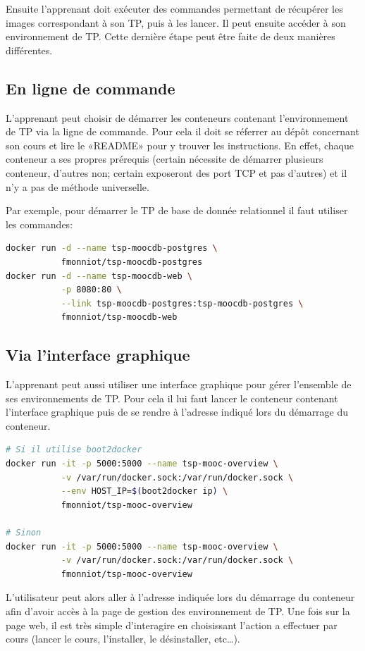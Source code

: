 \documentclass[a4paper,11pt]{report}
\begin{document}
Ensuite l'apprenant doit exécuter des commandes permettant de récupérer les images correspondant à son TP, puis à les lancer. Il peut ensuite accéder à son environnement de TP. Cette dernière étape peut être faite de deux manières différentes.

\subsection{En ligne de commande}

L'apprenant peut choisir de démarrer les conteneurs contenant l'environnement de TP via la ligne de commande. Pour cela il doit se réferrer au dépôt concernant son cours et lire le «README» pour y trouver les instructions. En effet, chaque conteneur a ses propres prérequis (certain nécessite de démarrer plusieurs conteneur, d'autres non; certain exposeront des port TCP et pas d'autres) et il n'y a pas de méthode universelle.

Par exemple, pour démarrer le TP de base de donnée relationnel il faut utiliser les commandes:

\begin{lstlisting}[language=Bash,caption={Démarrer les conteneurs du MOOC de base de donnée}]
docker run -d --name tsp-moocdb-postgres \
           fmonniot/tsp-moocdb-postgres
docker run -d --name tsp-moocdb-web \
           -p 8080:80 \
           --link tsp-moocdb-postgres:tsp-moocdb-postgres \
           fmonniot/tsp-moocdb-web
\end{lstlisting}


\subsection{Via l'interface graphique}

L'apprenant peut aussi utiliser une interface graphique pour gérer l'ensemble de ses environnements de TP. Pour cela il lui faut lancer le conteneur contenant l'interface graphique puis de se rendre à l'adresse indiqué lors du démarrage du conteneur.

\begin{lstlisting}[language=Bash,caption={Démarrer le conteneur Overview}]
# Si il utilise boot2docker
docker run -it -p 5000:5000 --name tsp-mooc-overview \
           -v /var/run/docker.sock:/var/run/docker.sock \
           --env HOST_IP=$(boot2docker ip) \
           fmonniot/tsp-mooc-overview

# Sinon
docker run -it -p 5000:5000 --name tsp-mooc-overview \
           -v /var/run/docker.sock:/var/run/docker.sock \
           fmonniot/tsp-mooc-overview
\end{lstlisting}

L'utilisateur peut alors aller à l'adresse indiquée lors du démarrage du conteneur afin d'avoir accès à la page de gestion des environnement de TP.
Une fois sur la page web, il est très simple d'interagire en choisissant l'action a effectuer par cours (lancer le cours, l'installer, le désinstaller, etc…).

\printbibliography
\lstlistoflistings
\listoffigures
\end{document}
